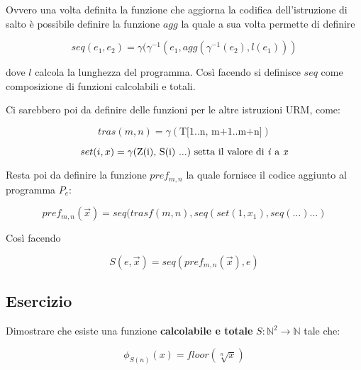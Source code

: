 Ovvero una volta definita la funzione che aggiorna la codifica dell'istruzione di salto è possibile definire la funzione $ agg $ la quale a sua volta permette di definire 

$$
seq(e_1, e_2) = \gamma(\gamma^{-1}(e_1, agg(\gamma^{-1}(e_2), l(e_1)))
$$

dove $ l $ calcola la lunghezza del programma. Così facendo si definisce $ seq $ come composizione di funzioni calcolabili e totali.

Ci sarebbero poi da definire delle funzioni per le altre istruzioni URM, come:

$$
tras(m,n) = \gamma(\text{T[1..n, m+1..m+n]})
$$

$$
set(i,x) = \gamma(\text{Z(i), S(i) ...}) \text{ setta il valore di \textit{i} a \textit{x}}
$$

Resta poi da definire la funzione $ pref_{m,n} $ la quale fornisce il codice aggiunto al programma $ P_e $:

$$
pref_{m,n}(\vec{x}) = seq(trasf(m,n), seq( set(1,x_1), seq( \ldots) \ldots )
$$

Così facendo

$$
S(e, \vec{x}) = seq(pref_{m,n}(\vec{x}) ,e )
$$

\subsection{Esercizio}

Dimostrare che esiste una funzione \textbf{calcolabile e totale}  $ S : \mathbb{N}^2 \rightarrow  \mathbb{N} $ tale che:

$$
\phi_{S(n)}(x) = floor(\sqrt[n]{x})
$$











